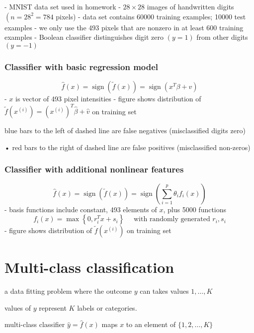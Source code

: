 - MNIST data set used in homework
- $ 28 \times 28 $ images of handwritten digits $ \left(n=28^{2}=784\right. $ pixels)
- data set contains 60000 training examples; 10000 test examples
- we only use the 493 pixels that are nonzero in at least 600 training examples
- Boolean classifier distinguishes digit zero $ (y=1) $ from other digits $ (y=-1) $

\subsubsection{Classifier with basic regression model}

$$
\hat{f}(x)=\operatorname{sign}(\tilde{f}(x))=\operatorname{sign}\left(x^{T} \beta+v\right)
$$
- $ x $ is vector of 493 pixel intensities
- figure shows distribution of $ \tilde{f}\left(x^{(i)}\right)=\left(x^{(i)}\right)^{T} \hat{\beta}+\hat{v} $ on training set

blue bars to the left of dashed line are false negatives (misclassified digits zero)

• red bars to the right of dashed line are false positives (misclassified non-zeros)

\subsubsection{Classifier with additional nonlinear features}

$$
\hat{f}(x)=\operatorname{sign}(\tilde{f}(x))=\operatorname{sign}\left(\sum_{i=1}^{p} \theta_{i} f_{i}(x)\right)
$$
- basis functions include constant, 493 elements of $ x $, plus 5000 functions
$$
f_{i}(x)=\max \left\{0, r_{i}^{T} x+s_{i}\right\} \quad \text { with randomly generated } r_{i}, s_{i}
$$
- figure shows distribution of $ \tilde{f}\left(x^{(i)}\right) $ on training set

\section{Multi-class classification}

\begin{problem}
    a data fitting problem where the outcome $ y $ can takes values $ 1, \ldots, K $

    values of $ y $ represent $ K $ labels or categories.

    multi-class classifier $ \hat{y}=\hat{f}(x) $ maps $ x $ to an element of $ \{1,2, \ldots, K\} $
\end{problem}


